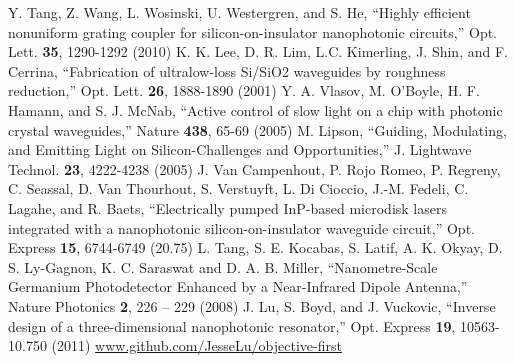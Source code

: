 \documentclass[letterpaper,10pt]{article}
\begin{document}
\begin{thebibliography}{99}
 Y. Tang, Z. Wang, L. Wosinski, U. Westergren, and S. He,
    ``Highly efficient nonuniform grating coupler for silicon-on-insulator 
    nanophotonic circuits,''
    Opt. Lett. \textbf{35}, 1290-1292 (2010)
  K. K. Lee, D. R. Lim, L.C. Kimerling, J. Shin, and F. Cerrina, 
    ``Fabrication of ultralow-loss Si/SiO2 waveguides by roughness reduction,''
    Opt. Lett. \textbf{26}, 1888-1890 (2001)
 Y. A. Vlasov, M. O'Boyle, H. F. Hamann, and S. J. McNab,
    ``Active control of slow light on a chip with photonic crystal waveguides,''
    Nature \textbf{438}, 65-69 (2005)
 M. Lipson, 
    ``Guiding, Modulating, and Emitting Light on 
    Silicon-Challenges and Opportunities,'' 
    J. Lightwave Technol. \textbf{23}, 4222-4238 (2005) 
 J. Van Campenhout, P. Rojo Romeo, P. Regreny, C. Seassal, 
    D. Van Thourhout, S. Verstuyft, L. Di Cioccio, J.-M. Fedeli, 
    C. Lagahe, and R. Baets, 
    ``Electrically pumped InP-based microdisk lasers integrated with a 
    nanophotonic silicon-on-insulator waveguide circuit,'' 
    Opt. Express \textbf{15}, 6744-6749 (20.75) 
 L. Tang, S. E. Kocabas, S. Latif, A. K. Okyay, 
    D. S. Ly-Gagnon, K. C. Saraswat and D. A. B. Miller, 
    ``Nanometre-Scale Germanium Photodetector Enhanced by a 
    Near-Infrared Dipole Antenna,'' 
    Nature Photonics \textbf{2}, 226 – 229 (2008) 
 J. Lu, S. Boyd, and J. Vuckovic, 
    ``Inverse design of a three-dimensional nanophotonic resonator,''
    Opt. Express \textbf{19}, 10563-10.750 (2011) 
 \url{www.github.com/JesseLu/objective-first}
\end{thebibliography}
\end{document}
